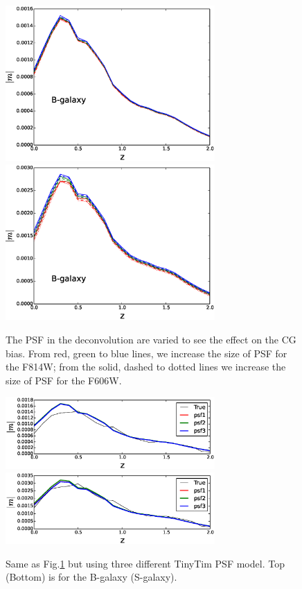 \documentclass[useAMS,usenatbib]{mn2e}
\begin{document}
%
\begin{figure}
\includegraphics[width=8.0cm]{varpsfB.eps}
\includegraphics[width=8.0cm]{varpsfS.eps}
\caption{The PSF in the deconvolution are varied to see the effect on
  the CG bias.  From red, green to blue lines, we increase the size of
  PSF for the F814W; from the solid, dashed to dotted lines we
  increase the size of PSF for the F606W.  }
\label{fig:psfacc1}
\end{figure}
%
\begin{figure}
\includegraphics[width=8.0cm]{z_b_psfcom05.eps}
\includegraphics[width=8.0cm]{z_s_psfcom05.eps}
\caption{Same as Fig.\ref{fig:psfacc1} but using three different
  TinyTim PSF model. Top (Bottom) is for the B-galaxy (S-galaxy).}
\label{fig:psfacc2}
\end{figure}
%
\end{document}
